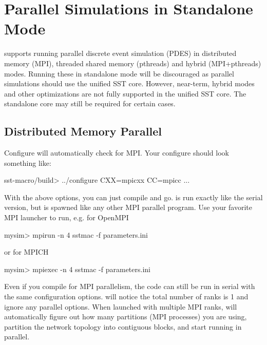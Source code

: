 \section{Parallel Simulations in Standalone Mode}
\label{sec:PDES}

\sstmacro supports running parallel discrete event simulation (PDES) in distributed memory (MPI), threaded shared memory (pthreads) and hybrid (MPI+pthreads) modes.  Running these in standalone mode will be discouraged as parallel simulations should use the unified SST core. However, near-term, hybrid modes and other optimizations are not fully supported in the unified SST core. The standalone core may still be required for certain cases.

\subsection{Distributed Memory Parallel}
\label{subsec:mpiparallel}
Configure will automatically check for MPI.
Your configure should look something like:

\begin{ShellCmd}
sst-macro/build> ../configure CXX=mpicxx CC=mpicc ...
\end{ShellCmd}
With the above options, you can just compile and go.
\sstmacro is run exactly like the serial version, but is spawned like any other MPI parallel program.
Use your favorite MPI launcher to run, e.g. for OpenMPI

\begin{ShellCmd}
mysim> mpirun -n 4 sstmac -f parameters.ini
\end{ShellCmd}
or for MPICH

\begin{ShellCmd}
mysim> mpiexec -n 4 sstmac -f parameters.ini
\end{ShellCmd}

Even if you compile for MPI parallelism, the code can still be run in serial with the same configuration options.
\sstmacro will notice the total number of ranks is 1 and ignore any parallel options.
When launched with multiple MPI ranks, \sstmacro will automatically figure out how many partitions (MPI processes) 
you are using, partition the network topology into contiguous blocks, and start running in parallel.   

